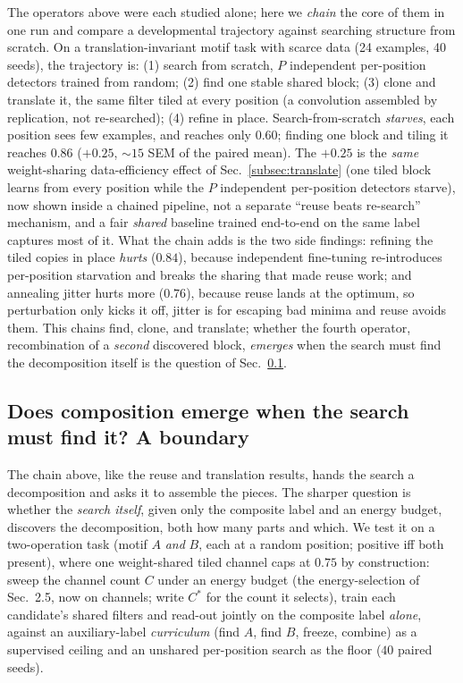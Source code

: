 \documentclass[11pt]{article}
\begin{document}
The operators above were each studied alone; here we \emph{chain} the core of them in one run and compare a
developmental trajectory against searching structure from scratch. On a translation-invariant motif task
with scarce data (24 examples, 40 seeds), the trajectory is: (1) search from scratch, $P$ independent
per-position detectors trained from random; (2) find one stable shared block; (3) clone and translate it,
the same filter tiled at every position (a convolution assembled by replication, not re-searched); (4)
refine in place. Search-from-scratch \emph{starves}, each position sees few examples, and reaches only
$0.60$; finding one block and tiling it reaches $0.86$ ($+0.25$, ${\sim}15$ SEM of the paired mean). The $+0.25$ is the \emph{same} weight-sharing data-efficiency effect of
Sec.~\ref{subsec:translate} (one tiled block learns from every position while the $P$ independent per-position
detectors starve), now shown inside a chained pipeline, not a separate ``reuse beats re-search''
mechanism, and a fair \emph{shared} baseline trained end-to-end on the same label captures most of it.
What the chain adds is the two side
findings: refining the tiled copies in place \emph{hurts} ($0.84$), because independent fine-tuning
re-introduces per-position starvation and breaks the sharing that made reuse work; and annealing jitter
hurts more ($0.76$), because reuse lands at the optimum, so perturbation only kicks it off, jitter is for
escaping bad minima and reuse avoids them. This chains find, clone, and translate; whether the fourth
operator, recombination of a \emph{second} discovered block, \emph{emerges} when the search must find the
decomposition itself is the question of Sec.~\ref{subsec:compose}.

\subsection{Does composition emerge when the search must find it? A boundary}\label{subsec:compose}

The chain above, like the reuse and translation results, hands the search a decomposition and asks it to
assemble the pieces. The sharper question is whether the \emph{search itself}, given only the composite
label and an energy budget, discovers the decomposition, both how many parts and which. We test it on a
two-operation task (motif $A$ \emph{and} $B$, each at a random position; positive iff both present), where
one weight-shared tiled channel caps at $0.75$ by construction: sweep the channel count $C$ under an energy
budget (the energy-selection of Sec.~2.5, now on channels; write $C^\ast$ for the count it selects),
train each candidate's shared filters and
read-out jointly on the composite label \emph{alone}, against an auxiliary-label \emph{curriculum} (find
$A$, find $B$, freeze, combine) as a supervised ceiling and an unshared per-position search as the floor
($40$ paired seeds).
\end{document}
